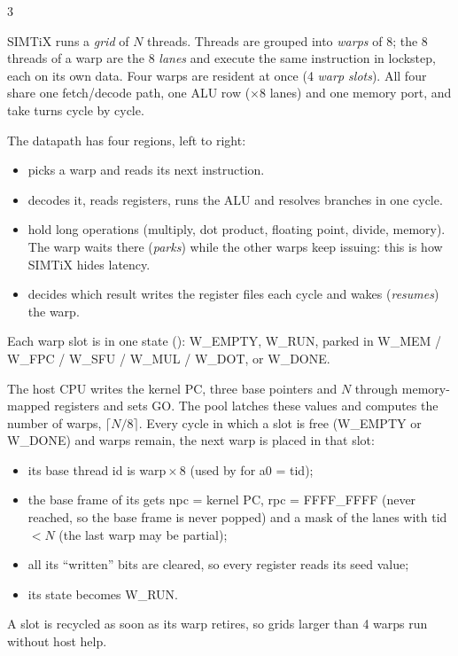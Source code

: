 \vspace{2mm}
\fontsize{8.5}{10.4}\selectfont
\begin{multicols*}{3}

SIMTiX runs a \emph{grid} of $N$ threads. Threads are grouped into \emph{warps} of 8; the 8 threads of a warp are the 8 \emph{lanes} and execute the same instruction in lockstep, each on its own data. Four warps are resident at once (4 \emph{warp slots}). All four share one fetch/decode path, one ALU row ($\times$8 lanes) and one memory port, and take turns cycle by cycle.

The datapath has four regions, left to right:
\begin{itemize}
\item {} picks a warp and reads its next instruction.
\item {} decodes it, reads registers, runs the ALU and resolves branches in one cycle.
\item {} hold long operations (multiply, dot product, floating point, divide, memory). The warp waits there (\emph{parks}) while the other warps keep issuing: this is how SIMTiX hides latency.
\item {} decides which result writes the register files each cycle and wakes (\emph{resumes}) the warp.
\end{itemize}
Each warp slot is in one state (): W\_EMPTY, W\_RUN, parked in W\_MEM / W\_FPC / W\_SFU / W\_MUL / W\_DOT, or W\_DONE.

The host CPU writes the kernel PC, three base pointers and $N$ through memory-mapped registers and sets GO. The pool latches these values and computes the number of warps, $\lceil N/8\rceil$.
Every cycle in which a slot is free (W\_EMPTY or W\_DONE) and warps remain, the next warp is placed in that slot:
\begin{itemize}
\item its base thread id is warp\,$\times$\,8 (used by  for a0 = tid);
\item the base frame of its  gets npc = kernel PC, rpc = FFFF\_FFFF (never reached, so the base frame is never popped) and a mask of the lanes with tid $<N$ (the last warp may be partial);
\item all its ``written'' bits are cleared, so every register reads its seed value;
\item its state becomes W\_RUN.
\end{itemize}
A slot is recycled as soon as its warp retires, so grids larger than 4 warps run without host help.


\end{multicols*}
